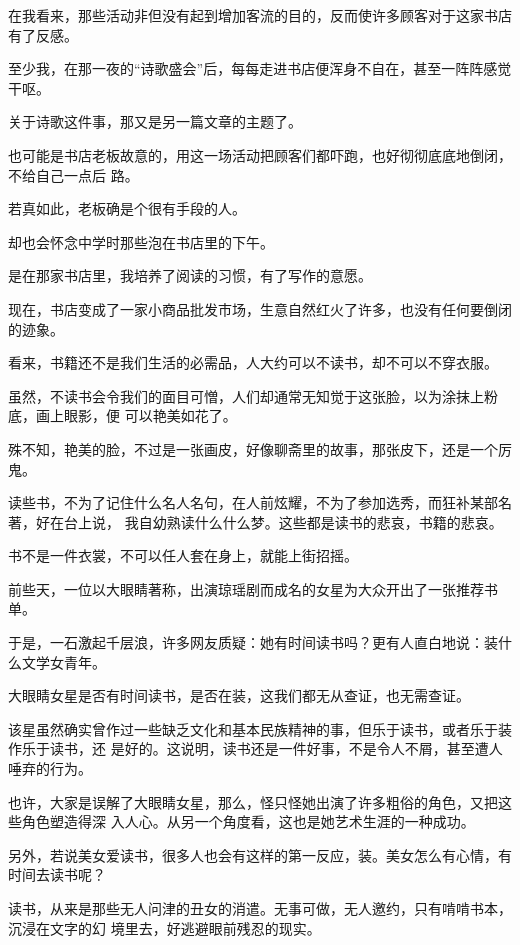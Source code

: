 		在我看来，那些活动非但没有起到增加客流的目的，反而使许多顾客对于这家书店有了反感。\par
		至少我，在那一夜的“诗歌盛会”后，每每走进书店便浑身不自在，甚至一阵阵感觉干呕。\par
		关于诗歌这件事，那又是另一篇文章的主题了。

		也可能是书店老板故意的，用这一场活动把顾客们都吓跑，也好彻彻底底地倒闭，不给自己一点后
	路。

		若真如此，老板确是个很有手段的人。



		却也会怀念中学时那些泡在书店里的下午。

		是在那家书店里，我培养了阅读的习惯，有了写作的意愿。\par
		现在，书店变成了一家小商品批发市场，生意自然红火了许多，也没有任何要倒闭的迹象。\par
		看来，书籍还不是我们生活的必需品，人大约可以不读书，却不可以不穿衣服。

		虽然，不读书会令我们的面目可憎，人们却通常无知觉于这张脸，以为涂抹上粉底，画上眼影，便
	可以艳美如花了。

		殊不知，艳美的脸，不过是一张画皮，好像聊斋里的故事，那张皮下，还是一个厉鬼。

		读些书，不为了记住什么名人名句，在人前炫耀，不为了参加选秀，而狂补某部名著，好在台上说，
	我自幼熟读什么什么梦。这些都是读书的悲哀，书籍的悲哀。

		书不是一件衣裳，不可以任人套在身上，就能上街招摇。

		前些天，一位以大眼睛著称，出演琼瑶剧而成名的女星为大众开出了一张推荐书单。\par
		于是，一石激起千层浪，许多网友质疑：她有时间读书吗？更有人直白地说：装什么文学女青年。\par
		大眼睛女星是否有时间读书，是否在装，这我们都无从查证，也无需查证。

		该星虽然确实曾作过一些缺乏文化和基本民族精神的事，但乐于读书，或者乐于装作乐于读书，还
	是好的。这说明，读书还是一件好事，不是令人不屑，甚至遭人唾弃的行为。

		也许，大家是误解了大眼睛女星，那么，怪只怪她出演了许多粗俗的角色，又把这些角色塑造得深
	入人心。从另一个角度看，这也是她艺术生涯的一种成功。

		另外，若说美女爱读书，很多人也会有这样的第一反应，装。美女怎么有心情，有时间去读书呢？

		读书，从来是那些无人问津的丑女的消遣。无事可做，无人邀约，只有啃啃书本，沉浸在文字的幻
	境里去，好逃避眼前残忍的现实。

